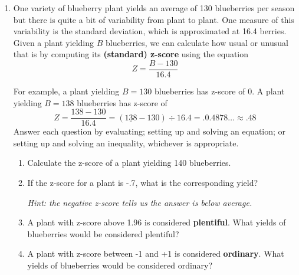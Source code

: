 \begin{enumerate}
\newpage %

\item One variety of blueberry plant yields an average of 130 blueberries per season but there is quite a bit of variability from plant to plant.  One measure of this variability is the standard deviation, which is approximated at 16.4 berries.  Given a plant yielding $B$ blueberries, we can calculate how usual or unusual that is by computing its \textbf{(standard) z-score} using the equation $$Z = \frac{B-130}{16.4}$$  

For example, a plant yielding $B=130$ blueberries has z-score of 0.  A plant yielding $B = 138$ blueberries has z-score of $$Z=\frac{138-130}{16.4} = (\underline{138}-130)\div 16.4 = .0.4878\ldots \approx .48$$ 
Answer each question by evaluating; setting up and solving an equation; or setting up and solving an inequality, whichever is appropriate.
\begin{enumerate}
\item Calculate the z-score of a plant yielding 140 blueberries.   \vfill
\item If the z-score for a plant is -.7, what is the corresponding yield?  

\emph{Hint:  the negative z-score tells us the answer is below average.}   \vfill
\item A plant with z-score above 1.96 is considered \textbf{plentiful}.  What yields of blueberries would be considered plentiful?   \vfill
\item A plant with  z-score between -1 and +1 is considered \textbf{ordinary}.  What yields of blueberries would be considered ordinary?   \vfill
\end{enumerate}

\end{enumerate}



